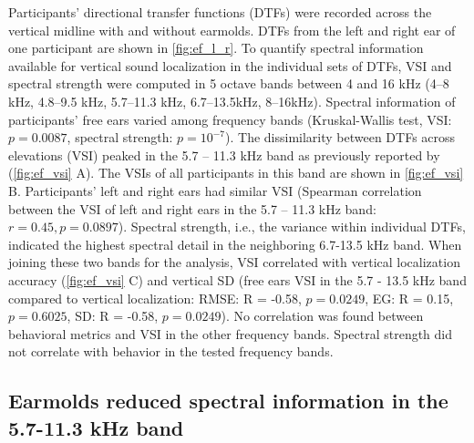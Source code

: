 Participants' directional transfer functions (DTFs) were recorded across the vertical midline with and without earmolds. DTFs from the left and right ear of one participant are shown in \cref{fig:ef_l_r}. To quantify spectral information available for vertical sound localization in the individual sets of DTFs, VSI \citep{trapeau_fast_2016} and spectral strength \citep{middlebrooks_individual_1999} were computed in 5 octave bands between 4 and 16 kHz (4–8 kHz, 4.8–9.5 kHz, 5.7–11.3 kHz, 6.7–13.5kHz, 8–16kHz). Spectral information of participants’ free ears varied among frequency bands (Kruskal-Wallis test, VSI: $p = 0.0087$, spectral strength: $p = 10^{-7}$). The dissimilarity between DTFs across elevations (VSI) peaked in the 5.7 – 11.3 kHz band as previously reported by \citet{trapeau_fast_2016} (\cref{fig:ef_vsi} A). The VSIs of all participants in this band are shown in \cref{fig:ef_vsi} B. Participants' left and right ears had similar VSI (Spearman correlation between the VSI of left and right ears in the 5.7 – 11.3 kHz band: $r = 0.45, p = 0.0897$). Spectral strength, i.e., the variance within individual DTFs, indicated the highest spectral detail in the neighboring 6.7-13.5 kHz band. When joining these two bands for the analysis, VSI correlated with vertical localization accuracy (\cref{fig:ef_vsi} C) and vertical SD (free ears VSI in the 5.7 - 13.5 kHz band compared to vertical localization: RMSE: R = -0.58, $p = 0.0249$, EG: R = 0.15, $p = 0.6025$, SD: R = -0.58, $p = 0.0249$). No correlation was found between behavioral metrics and VSI in the other frequency bands. Spectral strength did not correlate with behavior in the tested frequency bands.

\subsection{Earmolds reduced spectral information in the 5.7-11.3 kHz band}

